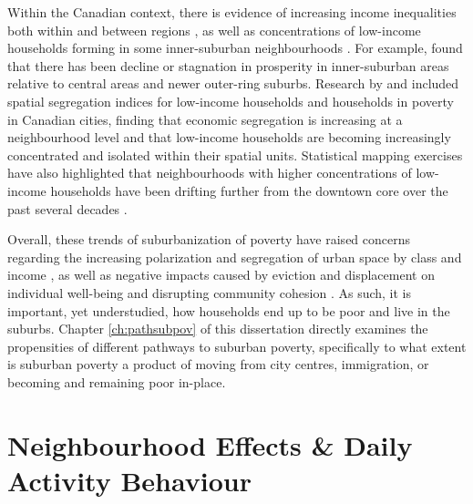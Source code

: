 Within the Canadian context, there is evidence of increasing income inequalities both within and between regions \cite{maclachlan_measures_1997,walks_income_2013,bolton_growing_2012,breau_rising_2015,chen_why_2012}, as well as concentrations of low-income households forming in some inner-suburban neighbourhoods \cite{ades_are_2012,pavlic_declining_2014,ades_is_2016,breau_pulling_2018}. For example,  found that there has been decline or stagnation in prosperity in inner-suburban areas relative to central areas and newer outer-ring suburbs. Research by  and  included spatial segregation indices for low-income households and households in poverty in Canadian cities, finding that economic segregation is increasing at a neighbourhood level and that low-income households are becoming increasingly concentrated and isolated within their spatial units. Statistical mapping exercises have also highlighted that neighbourhoods with higher concentrations of low-income households have been drifting further from the downtown core over the past several decades \cite{ades_are_2012,breau_pulling_2018}.

Overall, these trends of suburbanization of poverty have raised concerns regarding the increasing polarization and segregation of urban space by class and income \cite{hulchanski_three_2010,walks_income_2013,ades_are_2012}, as well as negative impacts caused by eviction and displacement on individual well-being and disrupting community cohesion \cite{august_challenging_2014,august_its_2016}. As such, it is important, yet understudied, how households end up to be poor and live in the suburbs. Chapter \ref{ch:pathsubpov} of this dissertation directly examines the propensities of different pathways to suburban poverty, specifically to what extent is suburban poverty a product of moving from city centres, immigration, or becoming and remaining poor in-place.


\section{Neighbourhood Effects \& Daily Activity Behaviour}

